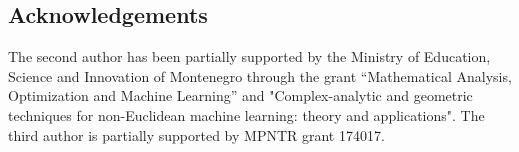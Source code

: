 \subsection*{Acknowledgements} The second author has been partially supported by the Ministry of Education, Science and Innovation of Montenegro through the grant ``Mathematical Analysis, Optimization and Machine Learning'' and "Complex-analytic and geometric techniques for non-Euclidean machine learning: theory and applications". The third author is partially supported by MPNTR grant 174017.











